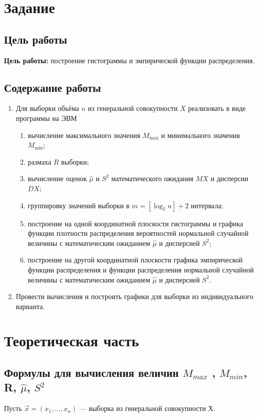\chapter{Задание}
\section{Цель работы}
\textbf{Цель работы:} построение гистограммы и эмпирической функции распределения.
\section{Содержание работы}
\begin{enumerate}
	\item Для выборки объёма $n$ из генеральной совокупности $X$ реализовать в виде программы на ЭВМ
	\begin{enumerate}
		\item вычисление максимального значения $M_{\max}$ и минимального значения $M_{\min}$;
		\item размаха $R$ выборки;
		\item вычисление оценок $\hat\mu$ и $S^2$ математического ожидания $MX$ и дисперсии $DX$;
		\item группировку значений выборки в $m = [\log_2 n] + 2$ интервала;
		\item построение на одной координатной плоскости гистограммы и графика функции плотности распределения вероятностей нормальной случайной величины с математическим ожиданием $\hat{\mu}$ и дисперсией $S^2$;
		\item построение на другой координатной плоскости графика эмпирической функции распределения и функции распределения нормальной случайной величины с математическим ожиданием $\hat{\mu}$ и дисперсией $S^2$.
	\end{enumerate}
	\item Провести вычисления и построить графики для выборки из индивидуального варианта.
\end{enumerate}


\chapter{Теоретическая часть}
\section{Формулы для вычисления величин $M_{max}$ , $M_{min}$, R, $\hat\mu$, $S^2$}

Пусть $\vec{x} = (x_1, \dots, x_n)$ --- выборка из генеральной совокупности Х.

